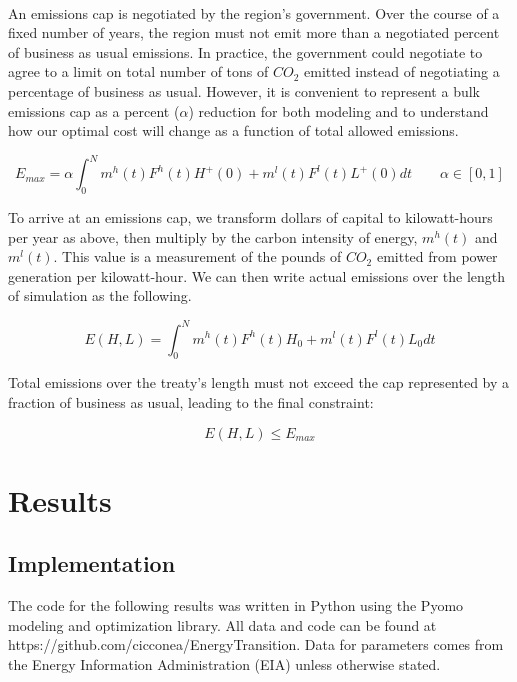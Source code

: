 \documentclass{article}
\begin{document}
\paragraph{} An emissions cap is negotiated by the region's government. Over the course of a fixed number of years, the region must not emit more than a negotiated percent of business as usual emissions. In practice, the government could negotiate to agree to a limit on total number of tons of $CO_2$ emitted instead of negotiating a percentage of business as usual. However, it is convenient to represent a bulk emissions cap as a percent ($\alpha$) reduction for both modeling and to understand how our optimal cost will change as a function of total allowed emissions.

\begin{equation}\label{eq:simpleMaxEmission}
E_{max} = \alpha \int_0^N m^h(t) F^h(t) H^+(0) + m^l(t) F^l(t) L^+(0) dt \qquad \alpha \in [0,1]
\end{equation}

To arrive at an emissions cap, we transform dollars of capital to kilowatt-hours per year as above, then multiply by the carbon intensity of energy, $m^h(t)$ and $m^l(t)$. This value is a measurement of the pounds of $CO_2$ emitted from power generation per kilowatt-hour. We can then write actual emissions over the length of simulation as the following. 

\begin{equation}\label{eq:simpleSimEmission}
E(H, L) = \int_0^N  m^h(t) F^h(t) H_0 + m^l(t) F^l(t) L_0 dt
\end{equation}

Total emissions over the treaty's length must not exceed the cap represented by a fraction of business as usual, leading to the final constraint: 

\begin{equation}\label{eq:simpleEmitConstraint}
E(H,L) \leq E_{max}
\end{equation}




\section{Results}

\subsection{Implementation}
The code for the following results was written in Python using the Pyomo modeling and optimization library. All data and code can be found at \\ https://github.com/cicconea/EnergyTransition. Data for parameters comes from the Energy Information Administration (EIA) unless otherwise stated.  
\end{document}
